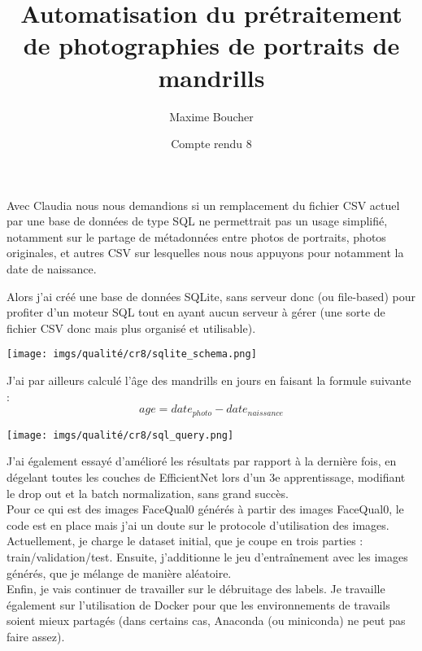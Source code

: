 \documentclass{article}
\title{Automatisation du prétraitement de photographies de portraits de mandrills}
\author{Maxime Boucher}
\date{Compte rendu 8}
\begin{document}
\maketitle

Avec Claudia nous nous demandions si un remplacement du fichier CSV actuel par une base de données de type SQL ne permettrait pas un usage simplifié, notamment sur le partage de métadonnées entre photos de portraits, photos originales, et autres CSV sur lesquelles nous nous appuyons pour notamment la date de naissance.

Alors j'ai créé une base de données SQLite, sans serveur donc (ou file-based) pour profiter d'un moteur SQL tout en ayant aucun serveur à gérer (une sorte de fichier CSV donc mais plus organisé et utilisable).

\begin{center}
    \texttt{[image: imgs/qualité/cr8/sqlite\_schema.png]}
\end{center}

J'ai par ailleurs calculé l'âge des mandrills en jours en faisant la formule suivante :
\begin{equation}
    age = date_{photo} - date_{naissance}
\end{equation}
\begin{center}
    \texttt{[image: imgs/qualité/cr8/sql\_query.png]}
\end{center}

J'ai également essayé d'amélioré les résultats par rapport à la dernière fois, en dégelant toutes les couches de EfficientNet lors d'un 3e apprentissage, modifiant le drop out et la batch normalization, sans grand succès.\\
Pour ce qui est des images FaceQual0 générés à partir des images FaceQual0, le code est en place mais j'ai un doute sur le protocole d'utilisation des images. Actuellement, je charge le dataset initial, que je coupe en trois parties : train/validation/test. Ensuite, j'additionne le jeu d'entraînement avec les images générés, que je mélange de manière aléatoire.\\

Enfin, je vais continuer de travailler sur le débruitage des labels. Je travaille également sur l'utilisation de Docker pour que les environnements de travails soient mieux partagés (dans certains cas, Anaconda (ou miniconda) ne peut pas faire assez).
\end{document}
